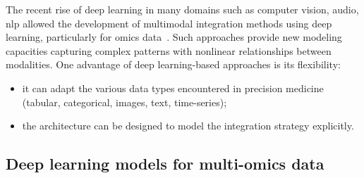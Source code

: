 \documentclass[../main.tex]{subfiles}
\begin{document}
		The recent rise of deep learning in many domains such as computer vision, audio, \gls{nlp} allowed the development of multimodal integration methods using deep learning, particularly for omics data~\cite{Kang2021}.
		Such approaches provide new modeling capacities capturing complex patterns with nonlinear relationships between modalities. 
		One advantage of deep learning-based approaches is its flexibility:
		\begin{itemize}[nosep]
			\item it can adapt the various data types encountered in precision medicine (tabular, categorical, images, text, time-series);
			\item the architecture can be designed to model the integration strategy explicitly. 
		\end{itemize}
		

	\subsection{Deep learning models for multi-omics data}
\end{document}
